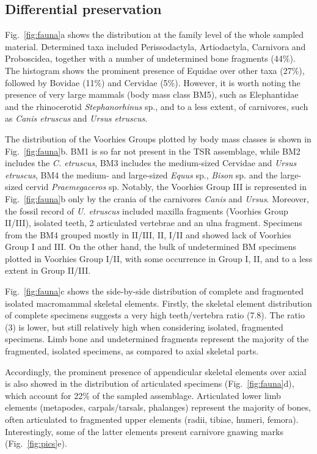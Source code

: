 \documentclass[5p,times,authoryear]{elsarticle}
\begin{document}
\subsection{Differential preservation}

Fig.~\ref{fig:fauna}a shows the distribution at the family level of the whole sampled material. Determined taxa included Perissodactyla, Artiodactyla, Carnivora and Proboscidea, together with a number of undetermined bone fragments (44\%). The histogram shows the prominent presence of Equidae over other taxa (27\%), followed by Bovidae (11\%) and Cervidae (5\%). However, it is worth noting the presence of very large mammals (body mass class BM5), such as Elephantidae and the rhinocerotid \emph{Stephanorhinus} sp., and to a less extent, of carnivores, such as \emph{Canis etruscus} and \emph{Ursus etruscus}.

The distribution of the Voorhies Groups plotted by body mass classes is shown in Fig.~\ref{fig:fauna}b. BM1 is so far not present in the TSR assemblage, while BM2 includes the \emph{C. etruscus}, BM3 includes the medium-sized Cervidae and \emph{Ursus etruscus}, BM4 the medium- and large-sized \emph{Equus} sp., \emph{Bison} sp. and the large-sized cervid \emph{Praemegaceros} sp. Notably, the Voorhies Group III is represented in Fig.~\ref{fig:fauna}b only by the crania of the carnivores \emph{Canis} and \emph{Ursus}. Moreover, the fossil record of \emph{U. etruscus} included maxilla fragments (Voorhies Group II/III), isolated teeth, 2 articulated vertebrae and an ulna fragment. Specimens from the BM4 grouped mostly in II/III, II, I/II and showed lack of Voorhies Group I and III. On the other hand, the bulk of undetermined BM specimens plotted in Voorhies Group I/II, with some occurrence in Group I, II, and to a less extent in Group II/III.

Fig.~\ref{fig:fauna}c shows the side-by-side distribution of complete and fragmented isolated macromammal skeletal elements. Firstly, the skeletal element distribution of complete specimens suggests a very high teeth/vertebra ratio (7.8). The ratio (3) is lower, but still relatively high when considering isolated, fragmented specimens. Limb bone and undetermined fragments represent the majority of the fragmented, isolated specimens, as compared to axial skeletal parts.

Accordingly, the prominent presence of appendicular skeletal elements over axial is also showed in the distribution of articulated specimens (Fig.~\ref{fig:fauna}d), which account for 22\% of the sampled assemblage. Articulated lower limb elements (metapodes, carpals/tarsals, phalanges) represent the majority of bones, often articulated to fragmented upper elements (radii, tibiae, humeri, femora). Interestingly, some of the latter elements present carnivore gnawing marks (Fig.~\ref{fig:pics}e).
\end{document}
